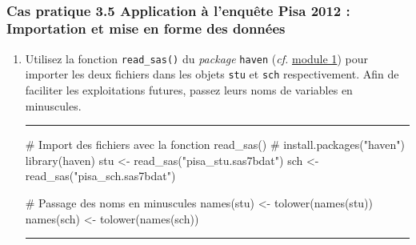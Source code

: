 \documentclass[12pt,twosided, notitlepage]{book}
\newenvironment{Shaded}{}{}
\newcommand{\KeywordTok}[1]{\textcolor[rgb]{0.00,0.00,1.00}{#1}}
\newcommand{\StringTok}[1]{\textcolor[rgb]{0.00,0.50,0.50}{#1}}
\newcommand{\CommentTok}[1]{\textcolor[rgb]{0.00,0.50,0.00}{#1}}
\newcommand{\NormalTok}[1]{#1}
\newif \ifsol
\renewenvironment{Shaded}{\begin{snugshade}}{\end{snugshade}}
\begin{document}
~

\subsubsection{\texorpdfstring{\textbf{Cas pratique 3.5} Application à
l'enquête Pisa 2012 : Importation et mise en forme des
données}{Cas pratique 3.5 Application à l'enquête Pisa 2012 : Importation et mise en forme des données}}\label{cas-pratique-3.5-application-a-lenquete-pisa-2012-importation-et-mise-en-forme-des-donnees}


\begin{enumerate}
\def\labelenumi{\alph{enumi}.}
\item
  Utilisez la fonction \texttt{read\_sas()} du
  \emph{package} \texttt{haven} (\emph{cf.} \underline{module 1}) pour
  importer les deux fichiers dans les objets \texttt{stu} et
  \texttt{sch} respectivement. Afin de faciliter les exploitations
  futures, passez leurs noms de variables en
  minuscules.

  \ifsol 

  \begin{center} \rule{0.5\linewidth}{\linethickness}\end{center}

\begin{Shaded}
\begin{Highlighting}[]
\CommentTok{# Import des fichiers avec la fonction read_sas()}
\CommentTok{# install.packages("haven")}
\KeywordTok{library}\NormalTok{(haven)}
\NormalTok{stu <-}\StringTok{ }\KeywordTok{read_sas}\NormalTok{(}\StringTok{"pisa_stu.sas7bdat"}\NormalTok{)}
\NormalTok{sch <-}\StringTok{ }\KeywordTok{read_sas}\NormalTok{(}\StringTok{"pisa_sch.sas7bdat"}\NormalTok{)}

\CommentTok{# Passage des noms en minuscules}
\KeywordTok{names}\NormalTok{(stu) <-}\StringTok{ }\KeywordTok{tolower}\NormalTok{(}\KeywordTok{names}\NormalTok{(stu))}
\KeywordTok{names}\NormalTok{(sch) <-}\StringTok{ }\KeywordTok{tolower}\NormalTok{(}\KeywordTok{names}\NormalTok{(sch))}
\end{Highlighting}
\end{Shaded}

  \begin{center} \rule{0.5\linewidth}{\linethickness}\end{center}


\end{enumerate}
\end{document}

